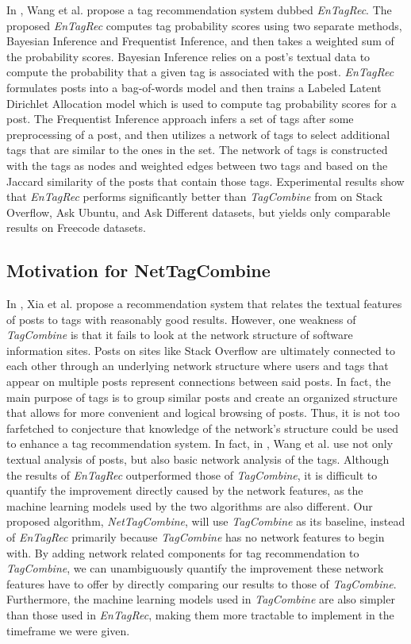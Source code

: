 \documentclass[11pt]{IEEEtran}
\begin{document}
In \cite{2}, Wang et al. propose a tag recommendation system dubbed \textit{EnTagRec}. The proposed \textit{EnTagRec} computes tag probability scores using two separate methods, Bayesian Inference and Frequentist Inference, and then takes a weighted sum of the probability scores. Bayesian Inference relies on a post’s textual data to compute the probability that a given tag is associated with the post. \textit{EnTagRec} formulates posts into a bag-of-words model and then trains a Labeled Latent Dirichlet Allocation model which is used to compute tag probability scores for a post. The Frequentist Inference approach infers a set of tags after some preprocessing of a post, and then utilizes a network of tags to select additional tags that are similar to the ones in the set. The network of tags is constructed with the tags as nodes and weighted edges between two tags and based on the Jaccard similarity of the posts that contain those tags. Experimental results show that \textit{EnTagRec} performs significantly better than \textit{TagCombine} from \cite{1} on Stack Overflow, Ask Ubuntu, and Ask Different datasets, but yields only comparable results on Freecode datasets.

\subsection{Motivation for NetTagCombine}

In \cite{1}, Xia et al. propose a recommendation system that relates the textual features of posts to tags with reasonably good results. However, one weakness of \textit{TagCombine} is that it fails to look at the network structure of software information sites. Posts on sites like Stack Overflow are ultimately connected to each other through an underlying network structure where users and tags that appear on multiple posts represent connections between said posts. In fact, the main purpose of tags is to group similar posts and create an organized structure that allows for more convenient and logical browsing of posts. Thus, it is not too farfetched to conjecture that knowledge of the network’s structure could be used to enhance a tag recommendation system. In fact, in \cite{2}, Wang et al. use not only textual analysis of posts, but also basic network analysis of the tags.  Although the results of \textit{EnTagRec} outperformed those of \textit{TagCombine}, it is difficult to quantify the improvement directly caused by the network features, as the machine learning models used by the two algorithms are also different. Our proposed algorithm, \textit{NetTagCombine}, will use \textit{TagCombine} as its baseline, instead of \textit{EnTagRec} primarily because \textit{TagCombine} has no network features to begin with. By adding network related components for tag recommendation to \textit{TagCombine}, we can unambiguously quantify the improvement these network features have to offer by directly comparing our results to those of \textit{TagCombine}. Furthermore, the machine learning models used in \textit{TagCombine} are also simpler than those used in \textit{EnTagRec}, making them more tractable to implement in the timeframe we were given.
\end{document}
